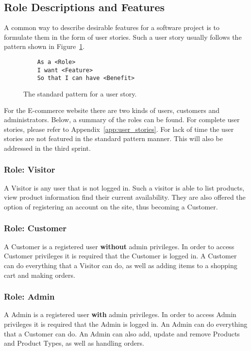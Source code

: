 \subsection{Role Descriptions and Features}

A common way to describe desirable features for a software project is to
formulate them in the form of user stories. Such a user story usually follows
the pattern shown in Figure~\ref{fig:user_story}.



\begin{figure}[H]
  \centering
  \begin{verbatim}
    As a <Role>
    I want <Feature>
    So that I can have <Benefit>
  \end{verbatim}
  \caption{\label{fig:user_story} The standard pattern for a user story.}
\end{figure}



For the E-commerce website there are two kinds of users, customers and
administrators. Below, a summary of the roles can be found. For complete user
stories, please refer to Appendix~\ref{app:user_stories}. For lack of time the user stories are not featured in the standard pattern manner. This will also be addressed in the third sprint. 

\subsubsection{Role: Visitor}\label{sec:visitor_role}

A Visitor is any user that is not logged in. Such a visitor is able to list
products, view product information find their current availability. They are
also offered the option of registering an account on the site, thus becoming
a Customer.

\subsubsection{Role: Customer}\label{sec:user_role}

A Customer is a registered user \textbf{without} admin privileges. In order to
access Customer privileges it is required that the Customer is logged in.
A Customer can do everything that a Visitor can do, as well as adding items
to a shopping cart and making orders.

\subsubsection{Role: Admin}\label{sec:admin_role}

A Admin is a registered user \textbf{with} admin privileges. In order to access
Admin privileges it is required that the Admin is logged in. An Admin can do
everything that a Customer can do. An Admin can also add, update and remove
Products and Product Types, as well as handling orders.
